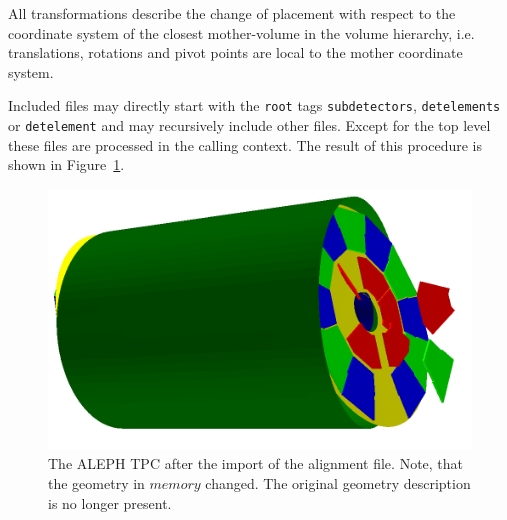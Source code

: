 \documentclass[10pt,a4paper]{article}
\begin{document}
\noindent
All transformations describe the change of placement with respect to the 
coordinate system of the closest mother-volume in the volume hierarchy,
i.e. translations, rotations and pivot points are local to the 
mother coordinate system.

\noindent
Included files may directly start with the {\tt root} tags {\tt subdetectors}, 
{\tt detelements} or {\tt detelement} and may recursively include other
files. Except for the top level these files are processed in the calling context.
The result of this procedure is shown in Figure~\ref{fig:dd4hep-aligned-hierarchies}.

\begin{figure}[h]
  \begin{center}
    \includegraphics[width=160mm] {DDAlign-misaligned-TPC}
    \caption{The ALEPH TPC after the import of the alignment file.
    Note, that the geometry in $memory$ changed. The original
    geometry description is no longer present.
    }
    \label{fig:dd4hep-aligned-hierarchies}
  \end{center}
\end{figure}


\noindent
\end{document}
